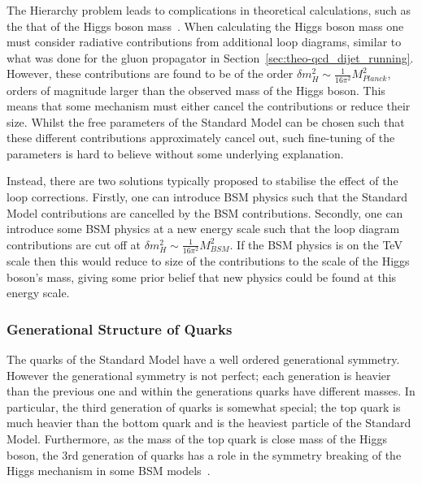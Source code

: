 The Hierarchy problem leads to complications in theoretical calculations, such as the that of the Higgs boson mass~\cite{theo-hierarchy}.
When calculating the Higgs boson mass one must consider
radiative contributions from additional loop diagrams,
similar to what was done for the gluon propagator in Section~\ref{sec:theo-qcd_dijet_running}.
However, these contributions are found to be of the order $\delta m_H^2 \sim \frac{1}{16\pi^2} M_{Planck}^2$\hspace{0.2mm},
orders of magnitude larger than the observed mass of the Higgs boson.
This means that some mechanism must either cancel the contributions or reduce their size.
Whilst the free parameters of the Standard Model can be chosen such that these different contributions approximately cancel out,
such fine-tuning of the parameters is hard to believe without some underlying explanation.

Instead, there are two solutions typically proposed to stabilise the effect of the loop corrections.
Firstly, one can introduce BSM physics such that the Standard Model contributions are cancelled by the BSM contributions.
Secondly, one can introduce some BSM physics at a new energy scale
such that the loop diagram contributions are cut off at $\delta m_H^2 \sim \frac{1}{16\pi^2} M_{BSM}^2$.
If the BSM physics is on the TeV scale then this would reduce to size of the contributions to the scale of the Higgs boson's mass,
giving some prior belief that new physics could be found at this energy scale.

\subsubsection{Generational Structure of Quarks}
\label{sec:theo-bsm_3g}

The quarks of the Standard Model have a well ordered generational symmetry.
However the generational symmetry is not perfect;
each generation is heavier than the previous one
and within the generations quarks have different masses.
In particular, the third generation of quarks is somewhat special;
the top quark is much heavier than the bottom quark
and is the heaviest particle of the Standard Model.
Furthermore, as the mass of the top quark is close mass of the Higgs boson,
the 3rd generation of quarks has a role in the symmetry breaking of the Higgs mechanism in some BSM models~\cite{theo-bsm_top}.

